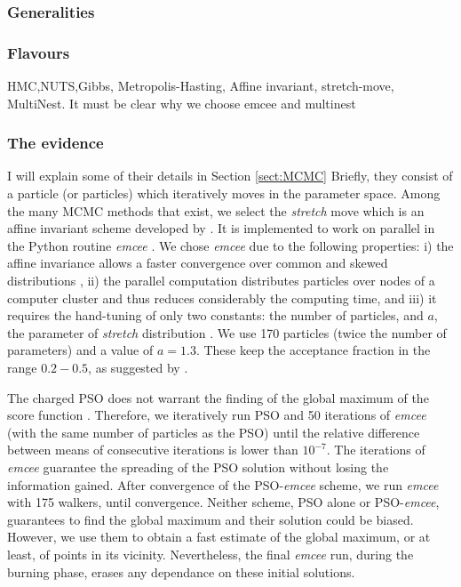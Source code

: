 \subsubsection{Generalities}
\subsubsection{Flavours}
HMC,NUTS,Gibbs, Metropolis-Hasting, Affine invariant, stretch-move, MultiNest.
It must be clear why we choose emcee and multinest
\subsubsection{The evidence}
 I will explain some of their details in Section \ref{sect:MCMC} Briefly, they consist of a particle (or particles) which iteratively moves in the parameter space. Among the many MCMC methods that exist, we select the \emph{stretch} move which is an affine invariant scheme developed by \citet{Goodman2010}. It is implemented to work on parallel in the Python routine \emph{emcee} \citep{Foreman2013}. We chose \emph{emcee} due to the following properties: i) the affine invariance allows a faster convergence over common and skewed distributions \cite[see][for detail]{Goodman2010,Foreman2013}, ii) the parallel computation distributes particles over nodes of a computer cluster and thus reduces considerably the computing time, and iii) it requires the hand-tuning of only two constants: the number of particles, and $a$, the parameter of \emph{stretch} distribution \cite[see Eq. 9 of ][]{Goodman2010}. We use 170 particles (twice the number of parameters) and a value of $a=1.3$. These keep the acceptance fraction in the range $0.2 - 0.5$, as suggested by \citet{Foreman2013}.
 
 
 The charged PSO does not warrant the finding of the global maximum of the score function \cite[see][and references therein]{Blackwell2002}. Therefore, we iteratively run PSO and 50 iterations of \emph{emcee} (with the same number of particles as the PSO) until the relative difference between means of consecutive iterations is lower than $10^{-7}$. The iterations of \emph{emcee} guarantee the spreading of the PSO solution without losing the information gained. After convergence of the PSO-\emph{emcee} scheme, we run \emph{emcee} with 175 walkers, until convergence. Neither scheme, PSO alone or PSO-\emph{emcee}, guarantees to find the global maximum and their solution could be biased. However, we use them to obtain a fast estimate of the global maximum, or at least, of points in its vicinity. Nevertheless, the final \emph{emcee} run, during the burning phase, erases any dependance on these initial solutions.
 
